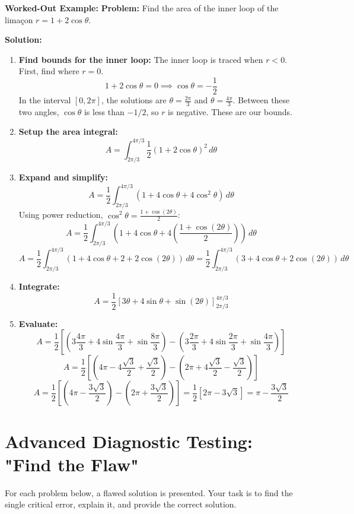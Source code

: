 \documentclass{article}
\begin{document}
\textbf{Worked-Out Example:}
\textbf{Problem:} Find the area of the inner loop of the limaçon $r = 1 + 2\cos\theta$.

\textbf{Solution:}
\begin{enumerate}
    \item \textbf{Find bounds for the inner loop:} The inner loop is traced when $r < 0$. First, find where $r=0$.
    \[ 1 + 2\cos\theta = 0 \implies \cos\theta = -\frac{1}{2} \]
    In the interval $[0, 2\pi]$, the solutions are $\theta = \frac{2\pi}{3}$ and $\theta = \frac{4\pi}{3}$. Between these two angles, $\cos\theta$ is less than $-1/2$, so $r$ is negative. These are our bounds.
    \item \textbf{Setup the area integral:}
    \[ A = \int_{2\pi/3}^{4\pi/3} \frac{1}{2} (1 + 2\cos\theta)^2 \,d\theta \]
    \item \textbf{Expand and simplify:}
    \[ A = \frac{1}{2} \int_{2\pi/3}^{4\pi/3} (1 + 4\cos\theta + 4\cos^2\theta) \,d\theta \]
    Using power reduction, $\cos^2\theta = \frac{1+\cos(2\theta)}{2}$:
    \[ A = \frac{1}{2} \int_{2\pi/3}^{4\pi/3} \left(1 + 4\cos\theta + 4\left(\frac{1+\cos(2\theta)}{2}\right)\right) \,d\theta \]
    \[ A = \frac{1}{2} \int_{2\pi/3}^{4\pi/3} (1 + 4\cos\theta + 2 + 2\cos(2\theta)) \,d\theta = \frac{1}{2} \int_{2\pi/3}^{4\pi/3} (3 + 4\cos\theta + 2\cos(2\theta)) \,d\theta \]
    \item \textbf{Integrate:}
    \[ A = \frac{1}{2} \left[ 3\theta + 4\sin\theta + \sin(2\theta) \right]_{2\pi/3}^{4\pi/3} \]
    \item \textbf{Evaluate:}
    \[ A = \frac{1}{2} \left[ \left(3\frac{4\pi}{3} + 4\sin\frac{4\pi}{3} + \sin\frac{8\pi}{3}\right) - \left(3\frac{2\pi}{3} + 4\sin\frac{2\pi}{3} + \sin\frac{4\pi}{3}\right) \right] \]
    \[ A = \frac{1}{2} \left[ \left(4\pi - 4\frac{\sqrt{3}}{2} + \frac{\sqrt{3}}{2}\right) - \left(2\pi + 4\frac{\sqrt{3}}{2} - \frac{\sqrt{3}}{2}\right) \right] \]
    \[ A = \frac{1}{2} \left[ (4\pi - \frac{3\sqrt{3}}{2}) - (2\pi + \frac{3\sqrt{3}}{2}) \right] = \frac{1}{2} [2\pi - 3\sqrt{3}] = \pi - \frac{3\sqrt{3}}{2} \]
\end{enumerate}

\part{Advanced Diagnostic Testing: "Find the Flaw"}
For each problem below, a flawed solution is presented. Your task is to find the single critical error, explain it, and provide the correct solution.
\end{document}
